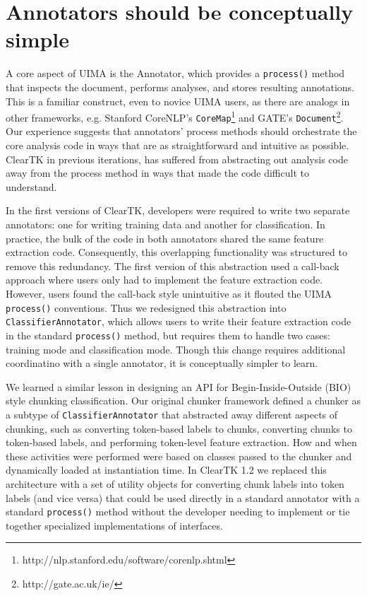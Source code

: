 \documentclass[10pt, a4paper]{article}
\newcommand{\code}[1]{\texttt{\small #1}}
\begin{document}
\section{Annotators should be conceptually simple}
\label{sec:annotators}
A core aspect of UIMA is the Annotator, which provides a \code{process()} method that inspects the document, performs analyses, and stores resulting annotations.  This is a familiar construct, even to novice UIMA users, as there are analogs in other frameworks, e.g. Stanford CoreNLP's \code{CoreMap}\footnote{http://nlp.stanford.edu/software/corenlp.shtml} and GATE's \code{Document}\footnote{http://gate.ac.uk/ie/}.  Our experience suggests that annotators' process methods should orchestrate the core analysis code in ways that are as straightforward and intuitive as possible.  ClearTK in previous iterations, has suffered from abstracting out analysis code away from the process method in ways that made the code difficult to understand.  

In the first versions of ClearTK, developers were required to write two separate annotators: one for writing training data and another for classification.
In practice, the bulk of the code in both annotators shared the same feature extraction code.  Consequently, this overlapping functionality was structured to remove this redundancy.  The first version of this abstraction used a call-back approach where users only had to implement the feature extraction code.  However, users found the call-back style unintuitive as it flouted the UIMA \code{process()} conventions.  
Thus we redesigned this abstraction into \code{ClassifierAnnotator}, which allows users to write their feature extraction code in the standard \code{process()} method, but requires them to handle two cases: training mode and classification mode.  Though this change requires additional coordinatino with a single annotator, it is conceptually simpler to learn.

We learned a similar lesson in designing an API for Begin-Inside-Outside (BIO) style chunking classification.
Our original chunker framework defined a chunker as a subtype of \code{ClassifierAnnotator} that abstracted away different aspects of chunking, such as converting token-based labels to chunks, converting chunks to token-based labels, and performing token-level feature extraction.
How and when these activities were performed were based on classes passed to the chunker and dynamically loaded at instantiation time.
In ClearTK 1.2 we replaced this architecture with a set of utility objects for converting chunk labels into token labels (and vice versa) that could be used directly in a standard annotator with a standard \code{process()} method without the developer needing to implement or tie together specialized implementations of interfaces.  
\end{document}
